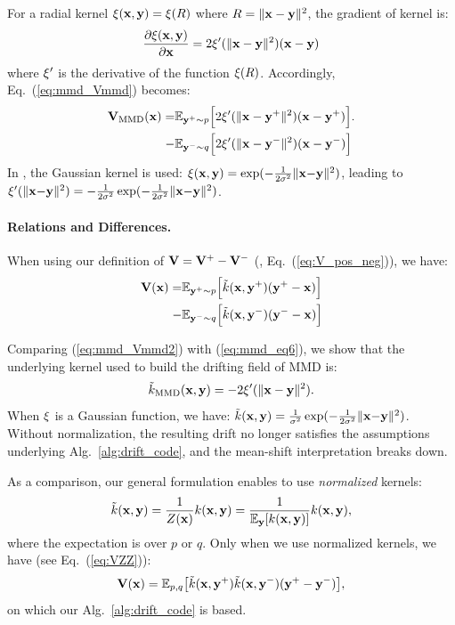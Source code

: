 For a radial kernel $\xi(\mathbf{x}, \mathbf{y})=\xi(R)$ where  $R=\|\mathbf{x} - \mathbf{y}\|^2$, the gradient of kernel is:
\begin{equation}
\frac{\partial\xi(\mathbf{x}, \mathbf{y})}{\partial\mathbf{x}} = 
2\xi'(\|\mathbf{x} - \mathbf{y}\|^2)(\mathbf{x} - \mathbf{y})
\end{equation}
where $\xi'$ is the derivative of the function $\xi(R)$.
Accordingly, Eq.~(\ref{eq:mmd_Vmmd}) becomes:
\begin{equation}
\begin{aligned}
\label{eq:mmd_Vmmd2}
\mathbf{V}_\text{MMD}(\mathbf{x})
= &
\mathbb{E}_{\mathbf{y}^{+}{\sim}p} \Big[
2\xi'(\|\mathbf{x} - \mathbf{y}^{+}\|^2)(\mathbf{x} - \mathbf{y}^{+})
\Big].
\\ - &
\mathbb{E}_{\mathbf{y}^{-}{\sim}q} \Big[
2\xi'(\|\mathbf{x} - \mathbf{y}^{-}\|^2)(\mathbf{x} - \mathbf{y}^{-})
\Big]
\end{aligned}
\end{equation}
In \cite{li2015generative}, the Gaussian kernel is used: $\xi(\mathbf{x}, \mathbf{y}) = \exp (-\frac{1}{2\sigma^2} \|\mathbf{x}{-}\mathbf{y}\|^2)$, leading to $\xi'(\|\mathbf{x}{-}\mathbf{y}\|^2)=-\frac{1}{2\sigma^2}\exp (-\frac{1}{2\sigma^2} \|\mathbf{x}{-}\mathbf{y}\|^2)$.

\paragraph{Relations and Differences.}
When using our definition of $\mathbf{V} = \mathbf{V}^{+} - \mathbf{V}^{-}$ (\ie, Eq.~(\ref{eq:V_pos_neg})), we have:
\begin{equation}
\begin{aligned}
\label{eq:mmd_eq6}
\mathbf{V}(\mathbf{x})
= & 
\mathbb{E}_{\mathbf{y}^{+}{\sim}p} \Big[
\tilde{k}(\mathbf{x}, \mathbf{y}^{+})(\mathbf{y}^{+} - \mathbf{x})
\Big] \\
- &
\mathbb{E}_{\mathbf{y}^{-}{\sim}q} \Big[
\tilde{k}(\mathbf{x}, \mathbf{y}^{-})(\mathbf{y}^{-} - \mathbf{x})
\Big]
\end{aligned}
\end{equation}

Comparing (\ref{eq:mmd_Vmmd2}) with (\ref{eq:mmd_eq6}), we show that the underlying kernel used to build the drifting field of MMD is:
\begin{equation}
\label{eq:mmd_eq7}
\tilde{k}_\text{MMD}(\mathbf{x}, \mathbf{y})=-2\xi'(\|\mathbf{x} - \mathbf{y}\|^2).
\end{equation}
When $\xi$ is a Gaussian function, we have: $\tilde{k}(\mathbf{x}, \mathbf{y})=\frac{1}{\sigma^2}\exp (-\frac{1}{2\sigma^2} \|\mathbf{x}{-}\mathbf{y}\|^2)$.
Without normalization, the resulting drift no longer satisfies the assumptions underlying Alg.~\ref{alg:drift_code}, and the mean-shift interpretation breaks down.

As a comparison, our general formulation enables to use \textit{normalized} kernels:
\begin{equation}
\tilde{k}(\mathbf{x}, \mathbf{y})=\frac{1}{Z(\mathbf{x})}k(\mathbf{x}, \mathbf{y})=\frac{1}{\mathbb{E}_{\mathbf{y}}[k(\mathbf{x}, \mathbf{y})]}k(\mathbf{x}, \mathbf{y}),
\end{equation}
where the expectation is over $p$ or $q$.
Only when we use normalized kernels, we have (see Eq.~(\ref{eq:VZZ})):
\begin{equation}
\mathbf{V}(\mathbf{x})
= {\mathbb{E}_{p,q}\!\left[\tilde{k}(\mathbf{x},\mathbf{y}^{+})\tilde{k}(\mathbf{x},\mathbf{y}^{-})(\mathbf{y}^{+} - \mathbf{y}^{-})\right]},
\end{equation}
on which our Alg.~\ref{alg:drift_code} is based.

